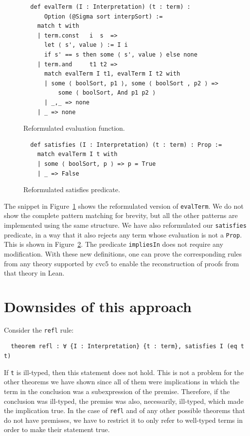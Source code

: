 \begin{figure}[t]
\begin{verbatim}
  def evalTerm (I : Interpretation) (t : term) :
      Option (@Sigma sort interpSort) :=
    match t with
    | term.const   i  s  =>
      let ⟨ s', value ⟩ := I i
      if s' == s then some ⟨ s', value ⟩ else none
    | term.and     t1 t2 =>
      match evalTerm I t1, evalTerm I t2 with
      | some ⟨ boolSort, p1 ⟩, some ⟨ boolSort , p2 ⟩ =>
          some ⟨ boolSort, And p1 p2 ⟩
      | _,_ => none
    | _ => none
\end{verbatim}
\caption{Reformulated evaluation function.}\label{evalTerm2}
\end{figure}


\begin{figure}[t]
\begin{verbatim}
  def satisfies (I : Interpretation) (t : term) : Prop :=
    match evalTerm I t with
    | some ⟨ boolSort, p ⟩ => p = True
    | _ => False
\end{verbatim}
\caption{Reformulated satisfies predicate.}\label{satisfiesPred}
\end{figure}

The snippet in Figure~\ref{evalTerm2} shows the reformulated version of \texttt{evalTerm}.
We do not show the complete pattern matching for brevity, but all the other
patterns are implemented using the same structure.
We have also reformulated our \texttt{satisfies} predicate, in a way that
it also rejects any term whose evaluation is not a \texttt{Prop}. This is shown
in Figure~\ref{satisfiesPred}. The predicate \texttt{impliesIn} does not require
any modification. With these new definitions, one can prove the corresponding
rules from any theory supported by cvc5 to enable the reconstruction of
proofs from that theory in Lean.

\section{Downsides of this approach}\label{sec:downsides}

Consider the \texttt{refl} rule:

\begin{verbatim}
  theorem refl : ∀ {I : Interpretation} {t : term}, satisfies I (eq t t)
\end{verbatim}

If \texttt{t} is ill-typed, then this statement does not hold. This is not
a problem for the other theorems we have shown since all of them were implications in
which the term in the conclusion was a subexpression of the premise. Therefore,
if the conclusion was ill-typed, the premiss was also, necessarily, ill-typed,
which made the implication true. In the case of \texttt{refl} and of
any other possible theorems that do not have premisses, we have to restrict it
to only refer to well-typed terms in order to make their statement true.

